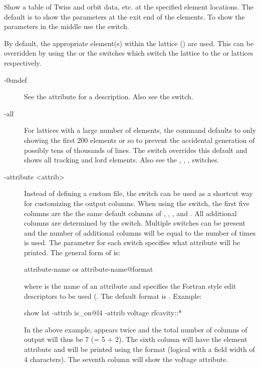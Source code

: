 {{{{{{{{Show a table of Twiss and orbit data, etc. at the specified element locations. The default is to
show the parameters at the exit end of the elements. To show the parameters in the middle use the
 switch.

By default, the appropriate element(s) within the  lattice () are
used. This can be overridden by using the  or the  switches which switch the
lattice to the  or  lattices respectively.

\begin{description}
\item[-0undef] \Newline
See the  attribute for a description. Also see the  switch.
%
\item[-all] \Newline
For lattices with a large number of elements, the  command defaults to only showing
the first 200 elements or so to prevent the accidental generation of possibly tens of thousands of
lines. The  switch overrides this default and shows all tracking and lord elements. Also
see the , , ,  switches.
%
\item[-attribute <attrib>] \Newline
Instead of defining a custom file, the  switch can be used as a shortcut way
for customizing the output columns.  When using the  switch, the first five columns
are the the same default columns of , , ,  and
. All additional columns are determined by the  switch. Multiple
 switches can be present and the number of additional columns will be equal to the
number of times  is used.  The  parameter for each 
switch specifies what attribute will be printed.  The general form of  is:
\begin{example}
  attribute-name         or
  attribute-name@format
\end{example}
where  is the name of an attribute and  specifies the Fortran style
edit descriptors to be used (. The default format is .  Example:
\begin{example}
  show lat -attrib is_on@l4 -attrib voltage rfcavity::*
\end{example}
In the above example,  appears twice and the total number of columns of output will
thus be 7 (= 5 + 2). The sixth column will have the  element attribute and will be printed
using the  format (logical with a field width of 4 characters). The seventh column will show
the voltage attribute.


\end{description}}}}}}}}}
